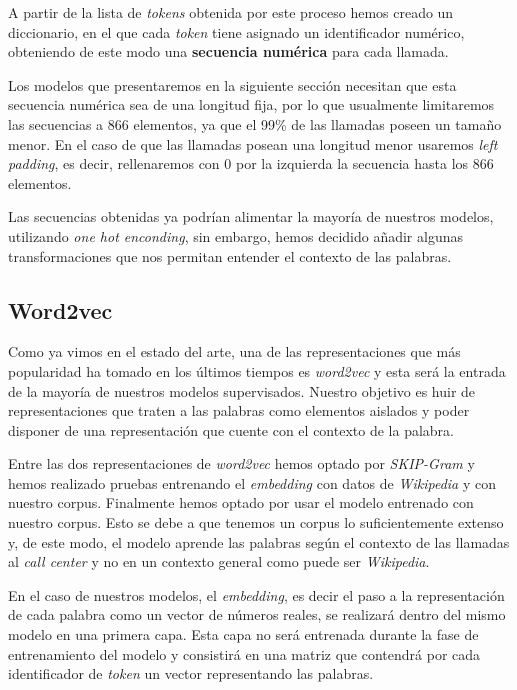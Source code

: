 A partir de la lista de \textit{tokens} obtenida por este proceso hemos creado un diccionario, en el que cada \textit{token} tiene asignado un identificador numérico, obteniendo de este modo una \textbf{secuencia numérica} para cada llamada. 

Los modelos que presentaremos en la siguiente sección necesitan que esta secuencia numérica sea de una longitud fija, por lo que usualmente limitaremos las secuencias a 866 elementos, ya que el 99\% de las llamadas poseen un tamaño menor. En el caso de  que las llamadas posean una longitud menor usaremos \textit{left padding}, es decir, rellenaremos con 0 por la izquierda la secuencia hasta los 866 elementos.


Las secuencias obtenidas ya podrían alimentar la mayoría de nuestros modelos, utilizando \textit{one hot enconding}, sin embargo, hemos decidido añadir algunas transformaciones que nos permitan entender el contexto de las palabras.  

\subsection{Word2vec}
Como ya vimos en el estado del arte, una de las representaciones que más popularidad ha tomado  en los últimos tiempos es \textit{word2vec} y esta será la entrada de la mayoría de nuestros modelos supervisados. Nuestro objetivo es huir de representaciones que traten a las palabras como elementos aislados y poder disponer de una representación que cuente con el contexto de la palabra.

Entre las dos representaciones de \textit{word2vec} hemos optado por \textit{SKIP-Gram} y hemos realizado pruebas entrenando el \textit{embedding} con datos de \textit{Wikipedia} y con nuestro corpus. Finalmente hemos optado por usar el modelo entrenado con nuestro corpus. Esto se debe a que tenemos un corpus lo suficientemente extenso y, de este modo, el modelo aprende las palabras según el contexto de las llamadas al \textit{call center} y no en un contexto general como puede ser \textit{Wikipedia}.

En el caso de nuestros modelos, el \textit{embedding}, es decir el paso a la representación de cada palabra como un vector de números reales, se realizará dentro del mismo modelo en una primera capa. Esta capa no será entrenada durante la fase de entrenamiento del modelo y consistirá en una matriz que contendrá por cada identificador de \textit{token} un vector representando las palabras. 


